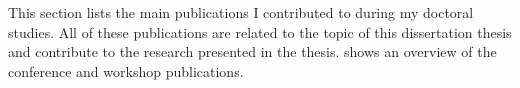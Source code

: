 \newcommand{\core}[3]{\href{https://portal.core.edu.au/conf-ranks/#3/}{CORE#1 conference rank: #2}}
\newcommand{\wos}[1]{\href{https://www.webofscience.com/wos/woscc/full-record/WOS:#1}{Web of Science record: #1}}
\newcommand{\scholar}{Source: \href{https://scholar.google.com/}{Google Scholar}. Date extracted: \DTMdisplaydate{2024}{9}{11}{-1}.}
\newcommand{\citations}[4]{\href{https://scholar.google.com/scholar?cites=#4}{Number of external citations: #2}}

This section lists the main publications I contributed to during my doctoral studies.
All of these publications are related to the topic of this dissertation thesis and contribute to the research presented in the thesis.
 shows an overview of the conference and workshop publications.


